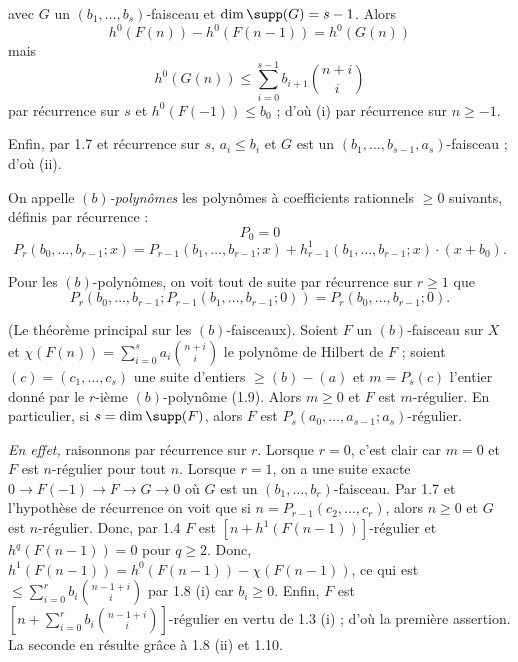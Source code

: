 \noindent
avec $G$ un $(b_1, \ldots, b_s)$-faisceau et $\dim \supp(G) = s-1$. Alors
\[
h^0(F(n)) - h^0(F(n-1)) = h^0(G(n))
\]
mais
\[
h^0(G(n)) \leq \sum_{i=0}^{s-1} b_{i+1} \binom{n+i}{i}
\]
par récurrence sur $s$ et $h^0(F(-1)) \leq b_0$ ; d'où (i) par récurrence sur $n \geq -1$.

Enfin, par 1.7 et récurrence sur $s$, $a_i \leq b_i$ et $G$ est un $(b_1, \ldots, b_{s-1}, a_s)$-faisceau ; d'où (ii).

\begin{defn}\label{def:1.9} On appelle \emph{$(b)$-polynômes} les polynômes à coefficients rationnels $\geq 0$ suivants, définis par récurrence :
\[
P_0 = 0
\]
\[
P_r(b_0, \ldots, b_{r-1}; x) = P_{r-1}(b_1, \ldots, b_{r-1}; x) + h^1_{r-1}(b_1, \ldots, b_{r-1}; x) \cdot (x + b_0).
\]
\end{defn}

\begin{rem}\label{rem:1.10} Pour les $(b)$-polynômes, on voit tout de suite par récurrence sur $r \geq 1$ que
\[
P_r(b_0, \ldots, b_{r-1}; P_{r-1}(b_1, \ldots, b_{r-1}; 0)) = P_r(b_0, \ldots, b_{r-1}; 0).
\]
\end{rem}

\begin{thm}\label{thm:1.11} \textup{(Le théorème principal sur les $(b)$-faisceaux).} Soient $F$ un $(b)$-faisceau sur $X$ et $\chi(F(n)) = \sum_{i=0}^{s} a_i \binom{n+i}{i}$ le polynôme de Hilbert de $F$ ; soient $(c) = (c_1, \ldots, c_s)$ une suite d'entiers $\geq (b) - (a)$ et $m = P_s(c)$ l'entier donné par le $r$-ième $(b)$-polynôme (1.9). Alors $m \geq 0$ et $F$ est $m$-régulier. En particulier, si $s = \dim \supp(F)$, alors $F$ est $P_s(a_0, \ldots, a_{s-1}; a_s)$-régulier.
\end{thm}

\noindent\textit{En effet,} raisonnons par récurrence sur $r$. Lorsque $r=0$, c'est clair car $m=0$ et $F$ est $n$-régulier pour tout $n$. Lorsque $r=1$, on a une suite exacte $0 \to F(-1) \to F \to G \to 0$ où $G$ est un $(b_1, \ldots, b_r)$-faisceau. Par 1.7 et l'hypothèse de récurrence on voit que si $n = P_{r-1}(c_2, \ldots, c_r)$, alors $n \geq 0$ et $G$ est $n$-régulier. Donc, par 1.4 $F$ est $[n + h^1(F(n-1))]$-régulier et $h^q(F(n-1)) = 0$ pour $q \geq 2$. Donc, $h^1(F(n-1)) = h^0(F(n-1)) - \chi(F(n-1))$, ce qui est $\leq \sum_{i=0}^{r} b_i \binom{n-1+i}{i}$ par 1.8 (i) car $b_i \geq 0$. Enfin, $F$ est $[n + \sum_{i=0}^{r} b_i \binom{n-1+i}{i}]$-régulier en vertu de 1.3 (i) ; d'où la première assertion. La seconde en résulte grâce à 1.8 (ii) et 1.10.

